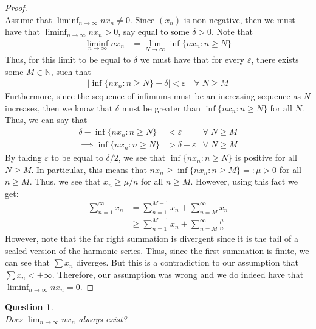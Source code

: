 \documentclass[10pt,a4paper]{article}
\newtheorem*{question*}{Question}
\theoremstyle{definition}
\theoremstyle{definition}
\begin{document}
\begin{proof}$ $
\\Assume that $\liminf_{n \to \infty} nx_n \neq 0$. Since $(x_n)$ is non-negative, then we must have that $\liminf_{n \to \infty} nx_n > 0$, say equal to some $\delta > 0$. Note that 
\begin{align*}
\liminf_{n \to \infty} nx_n &= \lim_{N \to \infty} \inf \{nx_n : n \geq N\}
\end{align*}
Thus, for this limit to be equal to $\delta$ we must have that for every $\varepsilon$, there exists some $M \in \mathbb{N}$, such that 
\begin{align*}
|\inf\{nx_n : n \geq N\} - \delta| < \varepsilon \quad \forall \; N \geq M
\end{align*}
Furthermore, since the sequence of infimums must be an increasing sequence as $N$ increases, then we know that $\delta$ must be greater than $\inf\{nx_n : n \geq N\}$ for all $N$. Thus, we can say that 
\begin{align*}
\delta - \inf\{nx_n : n \geq N\} &< \varepsilon & \forall \; N \geq M\\
\implies \inf\{nx_n : n \geq N\} &> \delta - \varepsilon & \forall \; N \geq M
\end{align*}
By taking $\varepsilon$ to be equal to $\delta / 2$, we see that $\inf\{nx_n : n \geq N\}$ is positive for all $N \geq M$. In particular, this means that $nx_n \geq \inf\{nx_n : n \geq M\} =: \mu > 0$ for all $n \geq M$. Thus, we see that $x_n \geq \mu/n$ for all $n \geq M$. However, using this fact we get:
\begin{align*}
\sum_{n = 1}^\infty x_n &= \sum_{n = 1}^{M-1} x_n + \sum_{n = M}^\infty x_n\\
&\geq \sum_{n = 1}^{M-1} x_n + \sum_{n = M}^\infty \frac{\mu}{n}
\end{align*}
However, note that the far right summation is divergent since it is the tail of a scaled version of the harmonic series. Thus, since the first summation is finite, we can see that $\sum x_n$ diverges. But this is a contradiction to our assumption that $\sum x_n < + \infty$. Therefore, our assumption was wrong and we do indeed have that $\liminf_{n \to \infty} nx_n = 0$. 
\end{proof}

\begin{question*}$ $
\\Does $\lim_{n \to \infty} nx_n$ always exist?
\end{question*}
\end{document}
